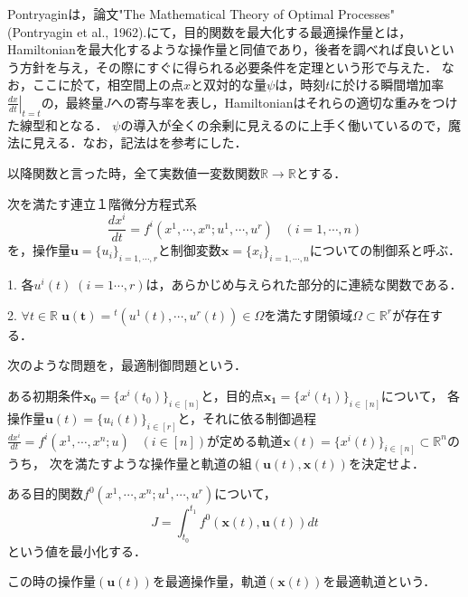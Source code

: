 \documentclass[uplatex,dvipdfmx]{jsreport}
\begin{document}
Pontryaginは，論文"The Mathematical Theory of Optimal Processes" (Pontryagin et al., 1962).にて，目的関数を最大化する最適操作量とは，Hamiltonianを最大化するような操作量と同値であり，後者を調べれば良いという方針を与え，その際にすぐに得られる必要条件を定理という形で与えた．
なお，ここに於て，相空間上の点$x$と双対的な量$\psi$は，時刻$t$に於ける瞬間増加率$\left.\frac{dx}{dt}\right|_{t=t}$の，最終量$J$への寄与率を表し，Hamiltonianはそれらの適切な重みをつけた線型和となる\cite{Shoot/root balance of plants: Optimal growth of a system with many vegetative organs}．
$\psi$の導入が全くの余剰に見えるのに上手く働いているので，魔法に見える．なお，記法は\cite{坂和愛幸}を参考にした．

以降関数と言った時，全て実数値一変数関数$\mathbb{R}\to\mathbb{R}$とする．
\begin{definition}[制御過程]
    次を満たす連立１階微分方程式系
    \[ \frac{dx^i}{dt}=f^i(x^1,\cdots,x^n;u^1,\cdots,u^r)\;\;\; (i=1,\cdots,n) \]
    を，操作量$\mathbf{u}=\{u_i\}_{i=1,\cdots,r}$と制御変数$\mathbf{x}=\{x_i\}_{i=1,\cdots,n}$についての制御系と呼ぶ．

    1. 各$u^i(t)\;(i=1\cdots,r)$は，あらかじめ与えられた部分的に連続な関数である．

    2. $\forall t\in\mathbb{R}\; \mathbf{u(t)}={}^t(u^1(t),\cdots,u^r(t))\in \Omega$を満たす閉領域$\Omega\subset\mathbb{R}^r$が存在する．
\end{definition}
\begin{definition}[最適制御問題]次のような問題を，最適制御問題という．

    ある初期条件$\mathbf{x_0}=\{x^i(t_0)\}_{i\in [n]}$と，目的点$\mathbf{x_1}=\{x^i(t_1)\}_{i\in [n]}$について，
    各操作量$\mathbf{u}(t)=\{u_i(t)\}_{i\in [r]}$と，それに依る制御過程$\frac{dx^i}{dt}=f^i(x^1,\cdots,x^n;u)\;\;\; (i\in [n])$が定める軌道$\mathbf{x}(t)=\{x^i(t)\}_{i\in [n]}\subset\mathbb{R}^n$のうち，
    次を満たすような操作量と軌道の組$(\mathbf{u}(t),\mathbf{x}(t))$を決定せよ．

    \begin{center}
        ある目的関数$f^0(x^1,\cdots,x^n;u^1,\cdots,u^r)$について，
    \[ J=\int^{t_1}_{t_0}f^0(\mathbf{x}(t),\mathbf{u}(t))dt \]
    という値を最小化する．
    \end{center}

    この時の操作量$(\mathbf{u}(t))$を最適操作量，軌道$(\mathbf{x}(t))$を最適軌道という．
\end{definition}
\end{document}
